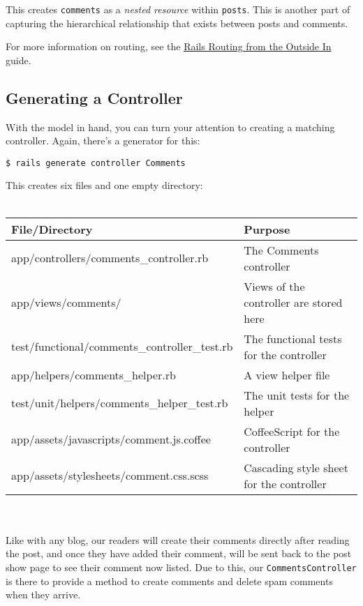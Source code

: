 \documentclass[10pt]{book}
\begin{document}
This creates \texttt{comments} as a \emph{nested resource} within \texttt{posts}. This is another part of capturing the hierarchical relationship that exists between posts and comments.

For more information on routing, see the \href{http://guides.rubyonrails.org/routing.html}{Rails Routing from the Outside In} guide.

\subsection{ Generating a Controller}


With the model in hand, you can turn your attention to creating a matching controller. Again, there’s a generator for this:
\begin{verbatim}
$ rails generate controller Comments
\end{verbatim}

This creates six files and one empty directory:
\\ \\
\begin{tabular}{ll}
\hline
\textbf{File/Directory} & \textbf{Purpose} \\ 
\hline
 app/controllers/comments\_controller.rb       &  The Comments controller                   \\ 
 app/views/comments/                          &  Views of the controller are stored here   \\ 
 test/functional/comments\_controller\_test.rb  &  The functional tests for the controller   \\ 
 app/helpers/comments\_helper.rb               &  A view helper file                        \\ 
 test/unit/helpers/comments\_helper\_test.rb    &  The unit tests for the helper             \\ 
 app/assets/javascripts/comment.js.coffee     &  CoffeeScript for the controller           \\ 
 app/assets/stylesheets/comment.css.scss      &  Cascading style sheet for the controller 
\end{tabular}
\\ \\

Like with any blog, our readers will create their comments directly after reading the post, and once they have added their comment, will be sent back to the post show page to see their comment now listed. Due to this, our \texttt{CommentsController} is there to provide a method to create comments and delete spam comments when they arrive.
\end{document}
